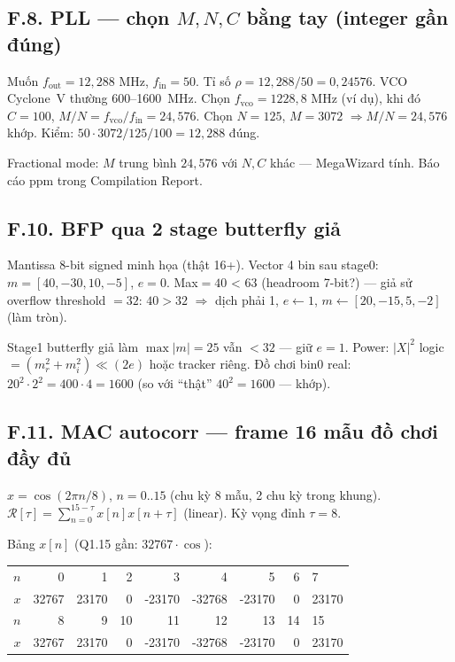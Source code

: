 \subsection*{F.8. PLL --- chọn $M,N,C$ bằng tay (integer gần đúng)}

Muốn $f_{\mathrm{out}}=12{,}288\text{ MHz}$, $f_{\mathrm{in}}=50$.
Tỉ số $\rho=12{,}288/50=0{,}24576$.
VCO Cyclone~V thường 600--1600~MHz. Chọn $f_{\mathrm{vco}}=1228{,}8\text{ MHz}$ (ví dụ), khi đó $C=100$, $M/N=f_{\mathrm{vco}}/f_{\mathrm{in}}=24{,}576$.
Chọn $N=125$, $M=3072$ $\Rightarrow M/N=24{,}576$ khớp.
Kiểm: $50\cdot3072/125/100=12{,}288$ đúng.

Fractional mode: $M$ trung bình $24{,}576$ với $N,C$ khác --- MegaWizard tính. Báo cáo ppm trong Compilation Report.

\subsection*{F.10. BFP qua 2 stage butterfly giả}

Mantissa 8-bit signed minh họa (thật 16+). Vector 4 bin sau stage0: $m=[40, -30, 10, -5]$, $e=0$.
Max$=40$ < 63 (headroom 7-bit?) --- giả sử overflow threshold $=32$: $40>32$ $\Rightarrow$ dịch phải 1, $e\leftarrow1$, $m\leftarrow[20,-15,5,-2]$ (làm tròn).

Stage1 butterfly giả làm $\max|m|=25$ vẫn $<32$ --- giữ $e=1$.
Power: $|X|^2$ logic $= (m_r^2+m_i^2)\ll(2e)$ hoặc tracker riêng. Đồ chơi bin0 real: $20^2\cdot2^{2}=400\cdot4=1600$ (so với ``thật'' $40^2=1600$ --- khớp).

\subsection*{F.11. MAC autocorr --- frame 16 mẫu đồ chơi đầy đủ}

$x=\cos(2\pi n/8)$, $n=0..15$ (chu kỳ 8 mẫu, 2 chu kỳ trong khung).
$\mathcal{R}[\tau]=\sum_{n=0}^{15-\tau}x[n]x[n+\tau]$ (linear). Kỳ vọng đỉnh $\tau=8$.

Bảng $x[n]$ (Q1.15 gần: $32767\cdot\cos$):
\begin{center}\footnotesize
\begin{tabular}{@{}rrrrrrrr@{}}
\toprule
$n$ & 0 & 1 & 2 & 3 & 4 & 5 & 6 & 7 \\
$x$ & 32767 & 23170 & 0 & -23170 & -32768 & -23170 & 0 & 23170 \\
\midrule
$n$ & 8 & 9 & 10 & 11 & 12 & 13 & 14 & 15 \\
$x$ & 32767 & 23170 & 0 & -23170 & -32768 & -23170 & 0 & 23170 \\
\bottomrule
\end{tabular}
\end{center}

